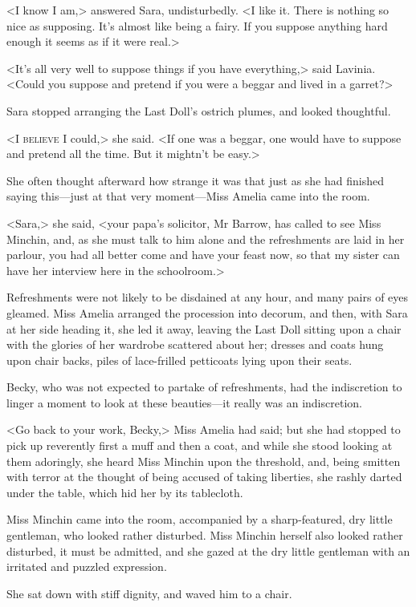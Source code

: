 <I know I am,> answered Sara, undisturbedly. <I like it. There is nothing so nice as supposing. It's almost like being a fairy. If you suppose anything hard enough it seems as if it were real.>

<It's all very well to suppose things if you have everything,> said Lavinia. <Could you suppose and pretend if you were a beggar and lived in a garret?>

Sara stopped arranging the Last Doll's ostrich plumes, and looked thoughtful.

<I \textsc{believe} I could,> she said. <If one was a beggar, one would have to suppose and pretend all the time. But it mightn't be easy.>

She often thought afterward how strange it was that just as she had finished saying this—just at that very moment—Miss Amelia came into the room.

<Sara,> she said, <your papa's solicitor, Mr Barrow, has called to see Miss Minchin, and, as she must talk to him alone and the refreshments are laid in her parlour, you had all better come and have your feast now, so that my sister can have her interview here in the schoolroom.>

Refreshments were not likely to be disdained at any hour, and many pairs of eyes gleamed. Miss Amelia arranged the procession into decorum, and then, with Sara at her side heading it, she led it away, leaving the Last Doll sitting upon a chair with the glories of her wardrobe scattered about her; dresses and coats hung upon chair backs, piles of lace-frilled petticoats lying upon their seats.

Becky, who was not expected to partake of refreshments, had the indiscretion to linger a moment to look at these beauties—it really was an indiscretion.

<Go back to your work, Becky,> Miss Amelia had said; but she had stopped to pick up reverently first a muff and then a coat, and while she stood looking at them adoringly, she heard Miss Minchin upon the threshold, and, being smitten with terror at the thought of being accused of taking liberties, she rashly darted under the table, which hid her by its tablecloth.

Miss Minchin came into the room, accompanied by a sharp-featured, dry little gentleman, who looked rather disturbed. Miss Minchin herself also looked rather disturbed, it must be admitted, and she gazed at the dry little gentleman with an irritated and puzzled expression.

She sat down with stiff dignity, and waved him to a chair.

